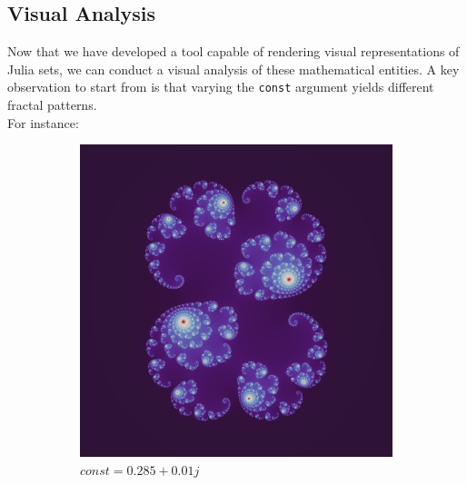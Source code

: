 \documentclass{article}
\begin{document}
\newpage
\subsection{Visual Analysis}

Now that we have developed a tool capable of rendering visual representations of Julia sets, we can conduct a visual analysis of these mathematical entities. A key observation to start from is that varying the \texttt{const} argument yields different fractal patterns.
\\
For instance:

\begin{figure}[H]
	\centering
	\begin{subfigure}[b]{0.45\linewidth}
		\includegraphics[width=\linewidth]{Utils/article_dependencies/Implementation_chapter/render_2.png}
		\caption{\footnotesize $const = 0.285 + 0.01j$}
	\end{subfigure}
	\hfill
	\hfill
	\begin{subfigure}[b]{0.45\linewidth}

\end{subfigure}
\end{figure}
\end{document}
